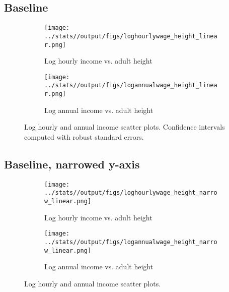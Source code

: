 \subsection{Baseline}
\begin{figure}[htbp]
	\begin{subfigure}[b]{0.9\textwidth}
		\centering
		\texttt{[image: ../stats//output/figs/loghourlywage\_height\_linear.png]}	
		\label{fig:loghourlywageheight}
		\caption{Log hourly income vs. adult height}
	\end{subfigure}
	
	\begin{subfigure}[b]{0.9\textwidth}
		\centering
		\texttt{[image: ../stats//output/figs/logannualwage\_height\_linear.png]}	
		\label{fig:logannualwageheight}
		\caption{Log annual income vs. adult height}
	\end{subfigure}
	\caption{Log hourly and annual income scatter plots. Confidence intervals computed with robust standard errors.}
\end{figure}

\clearpage
\subsection{Baseline, narrowed y-axis}
\begin{figure}[htbp]
	\begin{subfigure}[b]{0.9\textwidth}
		\centering
		\texttt{[image: ../stats//output/figs/loghourlywage\_height\_narrow\_linear.png]}	
		\label{fig:loghourlywageheight}
		\caption{Log hourly income vs. adult height}
	\end{subfigure}
	
	\begin{subfigure}[b]{0.9\textwidth}
		\centering
		\texttt{[image: ../stats//output/figs/logannualwage\_height\_narrow\_linear.png]}	
		\label{fig:logannualwageheight}
		\caption{Log annual income vs. adult height}
	\end{subfigure}
	\caption{Log hourly and annual income scatter plots.}
\end{figure}

\clearpage
